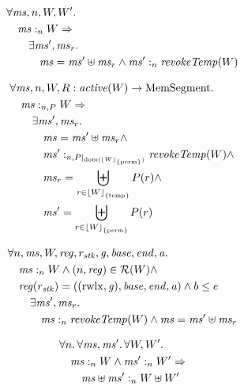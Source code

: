 \documentclass[a4paper]{article}
\DeclarePairedDelimiter\floor{\lfloor}{\rfloor}
\newcommand{\fun}{\rightarrow}
\DeclareMathOperator{\dom}{dom}
\newcommand{\var}[1]{\mathit{#1}}
\newcommand{\hs}{\var{ms}}
\newcommand{\ms}{\hs}
\newcommand{\gl}{\var{g}}
\newcommand{\addr}{\var{a}}
\newcommand{\start}{\var{base}}
\newcommand{\addrend}{\var{end}}
\newcommand{\reg}{\var{reg}}
\newcommand{\heap}{\var{mem}}
\newcommand{\stk}{\var{stk}}
\newcommand{\plainfun}[2]{
  \ifthenelse{\equal{#2}{}}
  {\mathit{#1}}
  {\mathit{#1}(#2)}
}
\newcommand{\revokeTemp}[1]{\plainfun{revokeTemp}{#1}}
\newcommand{\erase}[2]{\floor*{#1}_{\{#2\}}}
\newcommand{\activeReg}[1]{\plainfun{active}{#1}}
\newcommand{\heapSat}[3][\heap]{#1 :_{#2} #3}
\newcommand{\memSat}[3][n]{\heapSat[#2]{#1}{#3}}
\newcommand{\memSatPar}[4][n]{\heapSat[#2]{#1 , #4}{#3}}
\newcommand{\asmType}{\plaindom{AsmType}}
\newcommand{\plaindom}[1]{\mathrm{#1}}
\newcommand{\HeapSegments}{\plaindom{MemSegment}}
\newcommand{\MemSegments}{\HeapSegments}
\newcommand{\intr}[2]{\mathcal{#1}}
\newcommand{\regintr}[1]{\intr{R}{#1}}
\newcommand{\stdrr}{\regintr{\asmType}}
\newcommand{\npair}[2][n]{\left(#1,#2 \right)}
\newcommand{\plainperm}[1]{\mathrm{#1}}
\newcommand{\rwlx}{\plainperm{rwlx}}
\newcommand{\plainview}[1]{\mathrm{#1}}
\newcommand{\perma}{\plainview{perm}}
\newcommand{\temp}{\plainview{temp}}
\begin{document}
\begin{lemma}
  \label{lem:priv-mono-like}
  \begin{align*}
    &      \forall \hs, n, W, W' \ldotp \\
    & \quad  \heapSat[\hs]{n}{W} \Rightarrow\\
    & \qquad \exists \hs', \hs_r \ldotp \\
    & \qquad \quad \hs = \hs' \uplus \hs_r \land \heapSat[\hs']{n}{\wrev{W}}
  \end{align*}
\end{lemma}

\begin{lemma}
  \label{lem:priv-mono-like2}
  \begin{align*}
    & \forall \ms, n, W, R : \activeReg{W} \fun \MemSegments  \ldotp \\
    & \quad \memSatPar{\ms}{W}{P} \Rightarrow \\
    & \qquad \exists \ms', \ms_r\ldotp \\
    & \qquad \quad \ms = \ms' \uplus \ms_r \land \\
    & \qquad \quad \memSatPar{\ms'}{\wrev{W}}{P|_{\dom(\erase{W}{\perma})}} \land \\
    & \qquad \quad \ms_r = \biguplus_{r \in \erase{W}{\temp}} P(r) \land \\
    & \qquad \quad \ms' = \biguplus_{r \in \erase{W}{\perma}} P(r)
  \end{align*}
\end{lemma}

\begin{lemma}
  \label{lem:revoke-temp-stack}
  \begin{align*}
    & \forall n, \ms, W, \reg, r_\stk,\gl,\start,\addrend,\addr \ldotp\\
    & \quad \memSat{\ms}{W} \land \npair{\reg} \in \stdrr(W) \land \\
    & \quad \reg(r_\stk) = ((\rwlx,\gl),\start,\addrend,\addr) \land b \leq e \\
    & \qquad \exists \ms', \ms_r \ldotp \\
    & \qquad \quad \memSat{\ms }{\revokeTemp{W}} \land \ms = \ms' \uplus \ms_r
  \end{align*}
\end{lemma}

\begin{lemma}
  \label{lem:disj-mem-sat}
  \begin{align*}
    & \forall n \ldotp \forall \ms, \ms' \ldotp \forall W, W' \ldotp\\
    & \quad \memSat{\ms}{W} \land \memSat{\ms'}{W'} \Rightarrow \\
    & \qquad \heapSat[\ms \uplus \ms' ]{n}{W \uplus W'}
  \end{align*}
\end{lemma}
\end{document}
